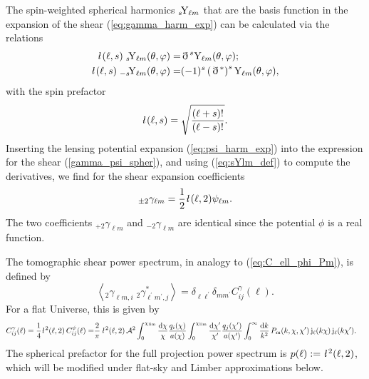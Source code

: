 \documentclass[fleqn,usenatbib]{mnras} %
\newcommand{\ellbar}{\hbox{\it \l}\,}
\newcommand{\pref}{{\cal A}}
\newcommand{\edth}{\,\eth\,}
\begin{document}
%
The spin-weighted spherical harmonics $_s\!{\rm Y}_{\ell m}$ that are the basis function
in the expansion of the shear (\ref{eq:gamma_harm_exp}) can be calculated via the relations
%
%
\begin{align}
  \ellbar(\ell, s) \; _s\!{\rm Y}_{\ell m}(\theta, \varphi) = & \edth^s {\rm Y}_{\ell m}(\theta, \varphi);
    \nonumber \\
  \ellbar(\ell, s) \; _{-s}\!{\rm Y}_{\ell m}(\theta, \varphi) = & (-1)^s \left(\edth^\ast\right)^s {\rm Y}_{\ell m}(\theta, \varphi),
  \label{eq:sYlm_def} 
\end{align}
%
with the spin prefactor \citep{2012PhRvD..86b3001B}
%
\begin{equation}
  \ellbar(\ell, s) = \sqrt{\frac{(\ell + s)!}{(\ell - s)!}}.
\end{equation} 
%
Inserting the lensing potential expansion (\ref{eq:psi_harm_exp}) into the
expression for the shear (\ref{gamma_psi_spher}), and using (\ref{eq:sYlm_def})
to compute the derivatives, we find for the shear expansion coefficients
\citep{2000PhRvD..62d3007H,2001astro.ph.11605T}
%
%
\begin{equation}
  _{\pm 2} \gamma_{\ell m} = \frac 1 2 \ellbar(\ell, 2) \psi_{\ell m}.
  \label{eq:gamma_ellm_phi_ellm}
\end{equation}
%
The two coefficients $_{+2} \gamma_{\ell m}$ and $_{-2} \gamma_{\ell m}$ are
identical since the potential $\phi$ is a real function.

The tomographic shear power spectrum, in analogy to (\ref{eq:C_ell_phi_Pm}), is defined by
%
\begin{equation}
  \left\langle _2\gamma^{}_{\ell m, i} \; {}_2\gamma^\ast_{\ell^\prime m^\prime, j} \right\rangle
    = \delta_{\ell \ell^\prime} \delta_{m m^\prime} C^\gamma_{ij}(\ell).
  \label{eq:C_ell_gamma}
\end{equation}
%
For a flat Universe, this is given by
%
\begin{align}
  C^\gamma_{ij}(\ell) = \frac 1 4 \ellbar^2(\ell, 2) \, C^\psi_{ij}(\ell)
                 = & \frac 2 \pi \, \ellbar^2(\ell, 2) \, \pref^2
                 \int_{0}^{\chi_{\rm lim}} \frac{\rm d \chi}{\chi} \frac{q_i(\chi)}{a(\chi)}
                \int_{0}^{\chi_{\rm lim}} \frac{\rm d \chi^\prime}{\chi^\prime}
                \frac{q_j(\chi^\prime)}{a(\chi^\prime)}
                \int_0^\infty \frac{{\rm d} k}{k^2} \, P_{\rm m}(k, \chi, \chi^\prime) \,
                {\rm j}_\ell(k \chi) \, {\rm j}_\ell(k \chi^\prime) .
  \label{eq:C_ell_full}
\end{align}
%
The spherical prefactor for the full projection power spectrum is $p(\ell) :=
\ellbar^2(\ell, 2)$, which will be modified under flat-sky and Limber
approximations below.
\end{document}
